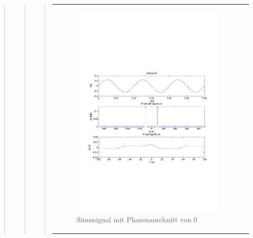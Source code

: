 \begin{quote}
\begin{quote}
\begin{quote}
\begin{center}
\begin{tabular}{ll}
\begin{minipage}{0.6\textwidth}
                        \begin{figure}[H]
                            \label{fig:}
                            \includegraphics[scale=0.5, trim = 1.5cm 7cm 1.5cm 8.5cm,
                            clip]{./Bilder/Phasenanschnitt08pi.pdf}
                            \caption{Sinussignal mit Phasenanschnitt von $0$}
                        \end{figure}
    
                    \end{minipage}
                    \begin{minipage}{0.6\textwidth}
    

\end{minipage}
\end{tabular}
\end{center}
\end{quote}
\end{quote}
\end{quote}
